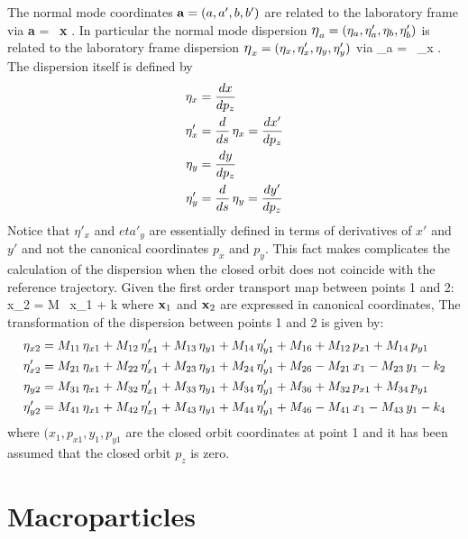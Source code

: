 The normal mode coordinates ${\bf a} = (a, a', b, b')$ are related to
the laboratory frame via
  \Begineq
    {\bf a} = \bfV\inv \, {\bf x}
    . \label{avx}
  \Endeq 
{}
In particular the normal mode dispersion ${\mbox{\large$\eta$}}_a = (\eta_a,
\eta'_a, \eta_b, \eta'_b)$ is related to the laboratory frame
dispersion ${\mbox{\large$\eta$}}_x = (\eta_x, \eta'_x, \eta_y, \eta'_y)$ via
  \Begineq
    {\bfeta_a} = \bfV\inv \, {\bfeta_x}
    . \label{etaavx}
  \Endeq 
The dispersion itself is defined by
\begin{align}
  \eta_x &= \frac{dx}{dp_z} \nonumber \\
  \eta'_x &= \frac{d}{ds} \, \eta_x = \frac{dx'}{dp_z} \\
  \eta_y &= \frac{dy}{dp_z} \nonumber \\
  \eta'_y &= \frac{d}{ds} \, \eta_y = \frac{dy'}{dp_z} \nonumber
\end{align}
Notice that $\eta'_x$ and $eta'_y$ are essentially defined in terms of
derivatives of $x'$ and $y'$ and not the canonical coordinates $p_x$
and $p_y$. This fact makes complicates the calculation of the
dispersion when the closed orbit does not coincide with the reference
trajectory. Given the first order transport map between points 1 and
2:
\Begineq
  \Bf x_2 = \Bf M \, \Bf x_1 + \Bf k
\Endeq
where ${\bf x}_1$ and ${\bf x}_2$ are expressed in canonical coordinates,
The transformation of the dispersion between points 1 and 2 is given
by:
\begin{align}
  \eta_{x2} &= 
    M_{11} \, \eta_{x1} + M_{12} \, \eta'_{x1} + 
    M_{13} \, \eta_{y1} + M_{14} \, \eta'_{y1} +
    M_{16} + M_{12} \, p_{x1} + M_{14} \, p_{y1} \nonumber \\
  \eta'_{x2} &=     
    M_{21} \, \eta_{x1} + M_{22} \, \eta'_{x1} + 
    M_{23} \, \eta_{y1} + M_{24} \, \eta'_{y1} +
    M_{26} - M_{21} \, x_1 - M_{23} \, y_1 - k_2 \\
  \eta_{y2} &= 
    M_{31} \, \eta_{x1} + M_{32} \, \eta'_{x1} + 
    M_{33} \, \eta_{y1} + M_{34} \, \eta'_{y1} +
    M_{36} + M_{32} \, p_{x1} + M_{34} \, p_{y1} \nonumber \\
  \eta'_{y2} &=     
    M_{41} \, \eta_{x1} + M_{42} \, \eta'_{x1} + 
    M_{43} \, \eta_{y1} + M_{44} \, \eta'_{y1} +
    M_{46} - M_{41} \, x_1 - M_{43} \, y_1 - k_4 \nonumber \\
\end{align}
where $(x_1, p_{x1}, y_1, p_{y1}$ are the closed orbit coordinates at
point 1 and it has been assumed that the closed orbit $p_z$ is zero.

\section{Macroparticles}
\label{s:macro}

